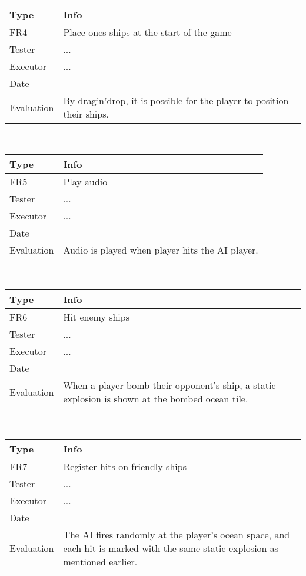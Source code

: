 \begin{tabular}{|l|l|}
	\hline
	\bf{Type}	& \bf{Info} \\
	\hline
	FR4			& Place ones ships at the start of the game \\
	Tester		& ... \\
	Executor	& ... \\
	Date		& \date{\today} \\
	Evaluation	& By drag'n'drop, it is possible for the player to position their ships. \\
	\hline
\end{tabular}
\\
\begin{tabular}{|l|l|}
	\hline
	\bf{Type}	& \bf{Info} \\
	\hline
	FR5			& Play audio \\
	Tester		& ... \\
	Executor	& ... \\
	Date		& \date{\today} \\
	Evaluation	& Audio is played when player hits the AI player. \\
	\hline
\end{tabular}
\\
\begin{tabular}{|l|l|}
	\hline
	\bf{Type}	& \bf{Info} \\
	\hline
	FR6			& Hit enemy ships \\
	Tester		& ... \\
	Executor	& ... \\
	Date		& \date{\today} \\
	Evaluation	& When a player bomb their opponent's ship, a static explosion is shown at the bombed ocean tile. \\
	\hline
\end{tabular}
\\
\begin{tabular}{|l|l|}
	\hline
	\bf{Type}	& \bf{Info} \\
	\hline
	FR7			& Register hits on friendly ships \\
	Tester		& ... \\
	Executor	& ... \\
	Date		& \date{\today} \\
	Evaluation	& The AI fires randomly at the player's ocean space, and each hit is marked with the same static explosion as mentioned earlier. \\
	\hline
\end{tabular}
\\